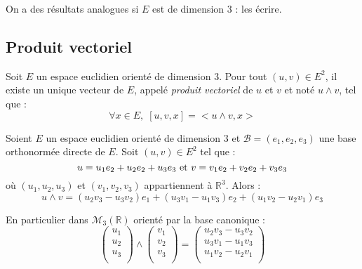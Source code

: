 \documentclass[a4paper,10pt]{report}
\begin{document}
\begin{exa} On a des résultats analogues si $E$ est de dimension $3$ : les écrire.
\end{exa}

\subsection{Produit vectoriel}

\begin{defip} Soit $E$ un espace euclidien orienté de dimension $3$. Pour tout $(u,v) \in E^2$, il existe un unique vecteur de $E$, appelé \textit{produit vectoriel} de $u$ et $v$ et noté $u \wedge v$, tel que :
$$ \forall x \in E, \; [u,v,x]=<u \wedge v, x>$$
\end{defip}

\begin{preuve}
\vspace{5cm}
\end{preuve}

\begin{prop} Soient $E$ un espace euclidien orienté de dimension $3$ et $\mathcal{B}=(e_1,e_2,e_3)$ une base orthonormée directe de $E$. Soit $(u,v) \in E^2$ tel que :
$$ u= u_1 e_2 + u_2e_2 + u_3e_3 \hbox{ et } v= v_1 e_2 + v_2e_2 + v_3e_3$$
où $(u_1,u_2,u_3)$ et $(v_1,v_2,v_3)$ appartiennent à $\mathbb{R}^3$. Alors :
$$ u \wedge v = (u_2 v_3-u_3v_2) e_1 + (u_3v_1-u_1 v_3) e_2 + (u_1v_2-u_2v_1) e_3 $$
\end{prop}

\begin{rem} En particulier dans $\mathcal{M}_3(\mathbb{R})$ orienté par la base canonique :
$$ \begin{pmatrix}
u_1 \\
u_2 \\
u_3 \\
\end{pmatrix} \wedge  \begin{pmatrix}
v_1 \\
v_2 \\
v_3 \\
\end{pmatrix} = \begin{pmatrix}
u_2 v_3-u_3v_2 \\
u_3v_1-u_1 v_3 \\
u_1v_2-u_2v_1\\
\end{pmatrix}$$
\end{rem}
\end{document}
